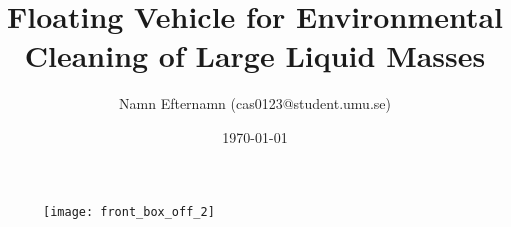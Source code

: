 \documentclass[11pt]{article}
\title{Floating Vehicle for Environmental Cleaning of Large Liquid Masses}
\author{Namn Efternamn (cas0123@student.umu.se)}
\date{\today}
\begin{document}
\begin{titlepage}
  \maketitle
  \thispagestyle{fancy}
  \rhead{\today}

\begin{figure}[H]
   \centering
   \texttt{[image: front\_box\_off\_2]}
   \label{fig:controller_front}
\end{figure}

  \begin{abstract}

  \end{abstract}

\end{titlepage}

\lhead{\thetitle}
\rhead{\today}
\cfoot{\thepage}



\clearpage

\tableofcontents
\clearpage




\clearpage

\clearpage

\clearpage

\clearpage

\clearpage

\appendix

\end{document}
